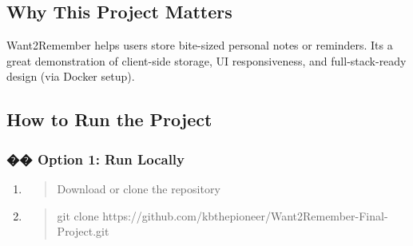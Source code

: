 \documentclass[
]{article}
\begin{document}
\hypertarget{why-this-project-matters}{%
\subsection{\texorpdfstring{\textbf{Why This Project
Matters}}{Why This Project Matters}}\label{why-this-project-matters}}

Want2Remember helps users store bite-sized personal notes or reminders.
It\textquotesingle s a great demonstration of client-side storage, UI
responsiveness, and full-stack-ready design (via Docker setup).

\hypertarget{how-to-run-the-project}{%
\subsection{\texorpdfstring{\textbf{How to Run the
Project}}{How to Run the Project}}\label{how-to-run-the-project}}

\hypertarget{option-1-run-locally}{%
\subsubsection{\texorpdfstring{\textbf{�� Option 1: Run
Locally}}{�� Option 1: Run locally}}\label{option-1-run-locally}}

\begin{enumerate}
\def\labelenumi{\arabic{enumi}.}
\item
  \begin{quote}
  Download or clone the repository
  \end{quote}
\item
  \begin{quote}
  git clone
  https://github.com/kbthepioneer/Want2Remember-Final-Project.git
  \end{quote}
\end{enumerate}
\end{document}
